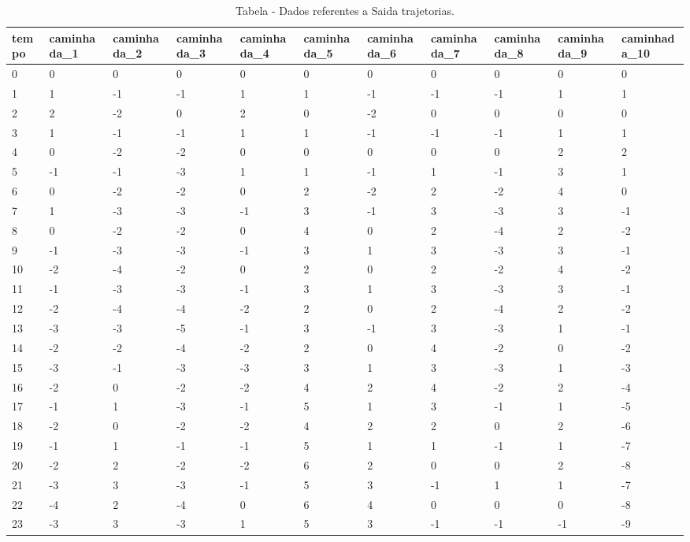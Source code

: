 \begin{table}[H]
\centering
\caption{Tabela - Dados referentes a Saida trajetorias.}
\label{tab:saida_trajetorias}
\begin{tabular}{lllllllllll}
\toprule
tempo & caminhada\_1 & caminhada\_2 & caminhada\_3 & caminhada\_4 & caminhada\_5 & caminhada\_6 & caminhada\_7 & caminhada\_8 & caminhada\_9 & caminhada\_10 \\
\midrule
0 & 0 & 0 & 0 & 0 & 0 & 0 & 0 & 0 & 0 & 0 \\
1 & 1 & -1 & -1 & 1 & 1 & -1 & -1 & -1 & 1 & 1 \\
2 & 2 & -2 & 0 & 2 & 0 & -2 & 0 & 0 & 0 & 0 \\
3 & 1 & -1 & -1 & 1 & 1 & -1 & -1 & -1 & 1 & 1 \\
4 & 0 & -2 & -2 & 0 & 0 & 0 & 0 & 0 & 2 & 2 \\
5 & -1 & -1 & -3 & 1 & 1 & -1 & 1 & -1 & 3 & 1 \\
6 & 0 & -2 & -2 & 0 & 2 & -2 & 2 & -2 & 4 & 0 \\
7 & 1 & -3 & -3 & -1 & 3 & -1 & 3 & -3 & 3 & -1 \\
8 & 0 & -2 & -2 & 0 & 4 & 0 & 2 & -4 & 2 & -2 \\
9 & -1 & -3 & -3 & -1 & 3 & 1 & 3 & -3 & 3 & -1 \\
10 & -2 & -4 & -2 & 0 & 2 & 0 & 2 & -2 & 4 & -2 \\
11 & -1 & -3 & -3 & -1 & 3 & 1 & 3 & -3 & 3 & -1 \\
12 & -2 & -4 & -4 & -2 & 2 & 0 & 2 & -4 & 2 & -2 \\
13 & -3 & -3 & -5 & -1 & 3 & -1 & 3 & -3 & 1 & -1 \\
14 & -2 & -2 & -4 & -2 & 2 & 0 & 4 & -2 & 0 & -2 \\
15 & -3 & -1 & -3 & -3 & 3 & 1 & 3 & -3 & 1 & -3 \\
16 & -2 & 0 & -2 & -2 & 4 & 2 & 4 & -2 & 2 & -4 \\
17 & -1 & 1 & -3 & -1 & 5 & 1 & 3 & -1 & 1 & -5 \\
18 & -2 & 0 & -2 & -2 & 4 & 2 & 2 & 0 & 2 & -6 \\
19 & -1 & 1 & -1 & -1 & 5 & 1 & 1 & -1 & 1 & -7 \\
20 & -2 & 2 & -2 & -2 & 6 & 2 & 0 & 0 & 2 & -8 \\
21 & -3 & 3 & -3 & -1 & 5 & 3 & -1 & 1 & 1 & -7 \\
22 & -4 & 2 & -4 & 0 & 6 & 4 & 0 & 0 & 0 & -8 \\
23 & -3 & 3 & -3 & 1 & 5 & 3 & -1 & -1 & -1 & -9 \\

\end{tabular}
\end{table}
